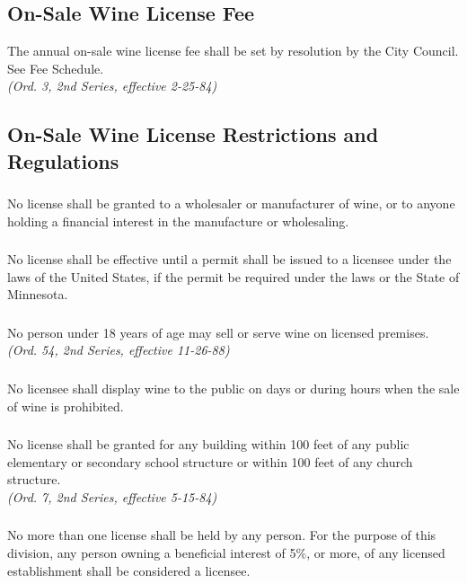 \subsection{On-Sale Wine License Fee}
The annual on-sale wine license fee shall be set by resolution by the City Council. See Fee Schedule.\\
\emph{(Ord. 3, 2nd Series, effective 2-25-84)}
\subsection{On-Sale Wine License Restrictions and Regulations}
\subsubsection{}
No license shall be granted to a wholesaler or manufacturer of wine, or to anyone holding a financial interest in the manufacture or wholesaling.
\subsubsection{}
No license shall be effective until a permit shall be issued to a licensee under the laws of the United States, if the permit be required under the laws or the State of Minnesota.
\subsubsection{}
No person under 18 years of age may sell or serve wine on licensed premises.\\
\emph{(Ord. 54, 2nd Series, effective 11-26-88)}
\subsubsection{}
No licensee shall display wine to the public on days or during hours when the sale of wine is prohibited.
\subsubsection{}
No license shall be granted for any building within 100 feet of any public elementary or secondary school structure or within 100 feet of any church structure.\\
\emph{(Ord. 7, 2nd Series, effective 5-15-84)}
\subsubsection{}
No more than one license shall be held by any person.  For the purpose of this division, any person owning a beneficial interest of 5\%, or more, of any licensed establishment shall be considered a licensee.
